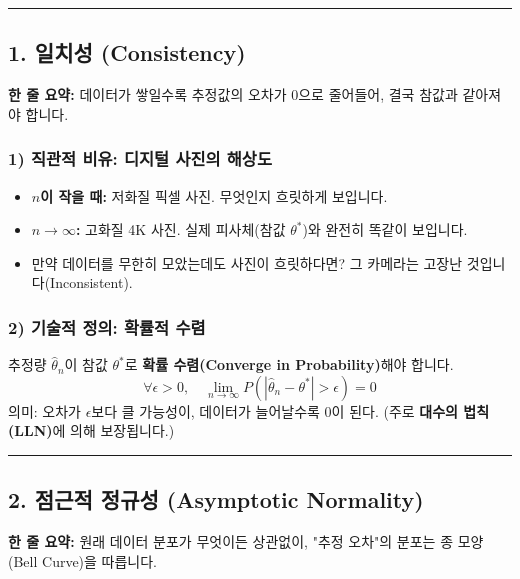 \documentclass[11pt,a4paper]{book}
\theoremstyle{definition}
\begin{document}
\vspace{0.5cm}\hrule\vspace{0.5cm}

\subsection{1. 일치성 (Consistency)}


\begin{conceptbox}[title={개념 1: 좋은 추정량의 최소 자격 요건}]
\textbf{한 줄 요약:} 데이터가 쌓일수록 추정값의 오차가 0으로 줄어들어, 결국 참값과 같아져야 합니다.
\end{conceptbox}

\subsubsection*{1) 직관적 비유: 디지털 사진의 해상도}
\begin{itemize}
    \item \textbf{$n$이 작을 때:} 저화질 픽셀 사진. 무엇인지 흐릿하게 보입니다.
    \item \textbf{$n \to \infty$:} 고화질 4K 사진. 실제 피사체(참값 $\theta^*$)와 완전히 똑같이 보입니다.
    \item 만약 데이터를 무한히 모았는데도 사진이 흐릿하다면? 그 카메라는 고장난 것입니다(Inconsistent).
\end{itemize}

\subsubsection*{2) 기술적 정의: 확률적 수렴}
추정량 $\hat{\theta}_n$이 참값 $\theta^*$로 \textbf{확률 수렴(Converge in Probability)}해야 합니다.
$$ \forall \epsilon > 0, \quad \lim_{n \to \infty} P(|\hat{\theta}_n - \theta^*| > \epsilon) = 0 $$
의미: 오차가 $\epsilon$보다 클 가능성이, 데이터가 늘어날수록 0이 된다.
(주로 \textbf{대수의 법칙(LLN)}에 의해 보장됩니다.)

\vspace{0.5cm}\hrule\vspace{0.5cm}

\subsection{2. 점근적 정규성 (Asymptotic Normality)}


\begin{conceptbox}[title={개념 2: 모든 길은 정규분포로 통한다}]
\textbf{한 줄 요약:} 원래 데이터 분포가 무엇이든 상관없이, "추정 오차"의 분포는 종 모양(Bell Curve)을 따릅니다.
\end{conceptbox}
\end{document}
